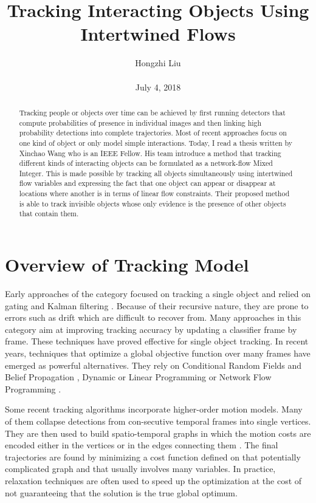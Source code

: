 \documentclass[10pt,twocolumn,letterpaper]{article}
\title{Tracking Interacting Objects Using Intertwined Flows}
\author{Hongzhi Liu\\\\
July 4, 2018}
\begin{document}
\maketitle
\begin{abstract}
	Tracking people or objects over time can be achieved by first running detectors that compute probabilities of presence in individual images and then linking high probability detections into complete trajectories. Most of recent approaches focus on one kind of object or only model simple interactions. Today, I read a thesis written by Xinchao Wang who is an IEEE Fellow. His team introduce a method that tracking different kinds of interacting objects can be formulated as a network-flow Mixed Integer. This is made possible by tracking all objects simultaneously using intertwined flow variables and expressing the fact that one object can appear or disappear at locations where another is in terms of linear flow constraints. Their proposed method is able to track invisible objects whose only evidence is the presence of other objects that contain them.
\end{abstract}
\section{Overview of Tracking Model}

Early approaches of the category focused on tracking a single object and relied on gating and Kalman filtering \cite{Mittal2003M}. Because of their recursive nature, they are prone to errors such as drift which are difficult to recover from. Many approaches in this category aim at improving tracking accuracy by updating a classifier frame by frame. These techniques have proved effective for single object tracking. In recent years, techniques that optimize a global objective function over many frames have emerged as powerful alternatives. They rely on Conditional Random Fields \cite{Lafferty2001Conditional} and Belief Propagation \cite{Yedidia2000Generalized}, Dynamic or Linear Programming \cite{Segal2013Latent} or Network Flow Programming \cite{Dehghan2015Target}. 

Some recent tracking algorithms incorporate higher-order motion models. Many of them collapse detections from con-secutive temporal frames into single vertices. They are then used to build spatio-temporal graphs in which the motion costs are encoded either in the vertices or in the edges connecting them \cite{Butt2013Multi,Chari2015On}. The final trajectories are found by minimizing a cost function defined on that potentially complicated graph and that usually involves many variables. In practice, relaxation techniques are often used to speed up the optimization at the cost of not guaranteeing that the solution is the true global optimum.
\end{document}
